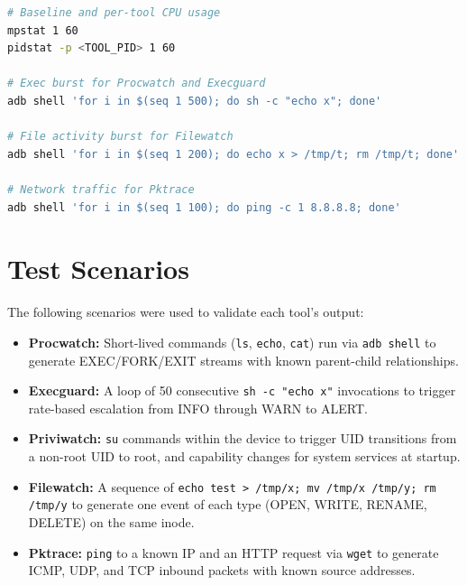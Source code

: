 \documentclass{mnitjaipur}
\begin{document}
\begin{lstlisting}[language=bash,caption={Performance measurement commands}]
# Baseline and per-tool CPU usage
mpstat 1 60
pidstat -p <TOOL_PID> 1 60

# Exec burst for Procwatch and Execguard
adb shell 'for i in $(seq 1 500); do sh -c "echo x"; done'

# File activity burst for Filewatch
adb shell 'for i in $(seq 1 200); do echo x > /tmp/t; rm /tmp/t; done'

# Network traffic for Pktrace
adb shell 'for i in $(seq 1 100); do ping -c 1 8.8.8.8; done'
\end{lstlisting}

\section{Test Scenarios}
The following scenarios were used to validate each tool's output:
\begin{itemize}
  \item \textbf{Procwatch:} Short-lived commands (\texttt{ls}, \texttt{echo}, \texttt{cat}) run via \texttt{adb shell} to generate EXEC/FORK/EXIT streams with known parent-child relationships.
  \item \textbf{Execguard:} A loop of 50 consecutive \texttt{sh -c "echo x"} invocations to trigger rate-based escalation from INFO through WARN to ALERT.
  \item \textbf{Priviwatch:} \texttt{su} commands within the device to trigger UID transitions from a non-root UID to root, and capability changes for system services at startup.
  \item \textbf{Filewatch:} A sequence of \texttt{echo test > /tmp/x; mv /tmp/x /tmp/y; rm /tmp/y} to generate one event of each type (OPEN, WRITE, RENAME, DELETE) on the same inode.
  \item \textbf{Pktrace:} \texttt{ping} to a known IP and an HTTP request via \texttt{wget} to generate ICMP, UDP, and TCP inbound packets with known source addresses.
\end{itemize}
\end{document}
